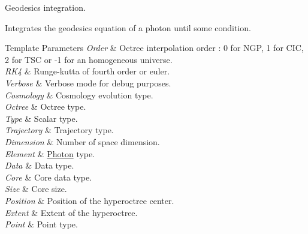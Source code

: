 Geodesics integration. 

Integrates the geodesics equation of a photon until some condition. 
\begin{DoxyTemplParams}{Template Parameters}
{\em Order} & Octree interpolation order \-: 0 for N\-G\-P, 1 for C\-I\-C, 2 for T\-S\-C or -\/1 for an homogeneous universe. \\
\hline
{\em R\-K4} & Runge-\/kutta of fourth order or euler. \\
\hline
{\em Verbose} & Verbose mode for debug purposes. \\
\hline
{\em Cosmology} & Cosmology evolution type. \\
\hline
{\em Octree} & Octree type. \\
\hline
{\em Type} & Scalar type. \\
\hline
{\em Trajectory} & Trajectory type. \\
\hline
{\em Dimension} & Number of space dimension. \\
\hline
{\em Element} & \hyperlink{exceptionPhoton}{Photon} type. \\
\hline
{\em Data} & Data type. \\
\hline
{\em Core} & Core data type. \\
\hline
{\em Size} & Core size. \\
\hline
{\em Position} & Position of the hyperoctree center. \\
\hline
{\em Extent} & Extent of the hyperoctree. \\
\hline
{\em Point} & Point type. \\
\hline
\end{DoxyTemplParams}

